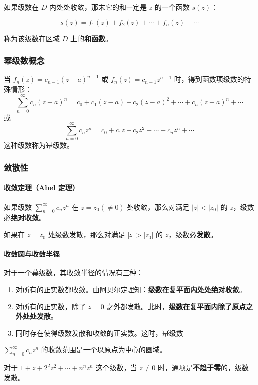 如果级数在 \(D\) 内处处收敛，那末它的和一定是 \(z\) 的一个函数
\(s(z)\)：

\[
s(z) = f_1(z) + f_2(z) + \cdots + f_n(z) + \cdots
\]

称为该级数在区域 \(D\) 上的\textbf{和函数}。
\subsubsection{幂级数概念}
\label{幂级数概念}
当 \(f_n(z) = c_{n-1}(z-a)^{n-1}\) 或 \(f_n(z) = c_{n-1}z^{n-1}\)
时，得到函数项级数的特殊情形：
\[
\sum_{n=0}^{\infty} c_n (z-a)^n = c_0 + c_1(z-a) + c_2(z-a)^2 + \cdots + c_n(z-a)^n + \cdots
\]
或
\[
\sum_{n=0}^{\infty} c_n z^n = c_0 + c_1 z + c_2 z^2 + \cdots + c_n z^n + \cdots
\]
这种级数称为幂级数。
\subsubsection{敛散性}
\label{敛散性}
\paragraph{收敛定理（Abel 定理）}
\label{收敛定理 abel 定理}
如果级数 \(\sum_{n=0}^{\infty} c_{n} z^{n}\) 在 \(z = z_{0} (\neq 0)\)
处收敛，那么对满足 \(|z| < |z_{0}|\) 的 \(z\)，级数必\textbf{绝对收敛}。

如果在 \(z = z_{0}\) 处级数发散，那么对满足 \(|z| > |z_{0}|\) 的
\(z\)，级数必\textbf{发散}。
\paragraph{收敛圆与收敛半径}
\label{收敛圆与收敛半径}
对于一个幕级数，其收敛半径的情况有三种：

\begin{enumerate}
\item 对所有的正实数都收敛。由阿贝尔定理知：\textbf{级数在复平面内处处绝对收敛}。
\item 对所有的正实数，除了 \(z=0\)
之外都发散。此时，\textbf{级数在复平面内除了原点之外处处发散}。
\item 同时存在使得级数发散和收敛的正实数。这时，幂级数
\end{enumerate}
\(\sum\limits _{n=0}^{\infty}c_nz^n\)
的收敛范围是一个以原点为中心的圆域。

\begin{tcolorbox}[title={Example},colback=red!5!white
,colframe=red!75!black
,colbacktitle=yellow!50!red
,coltitle=red!25!black, fonttitle=\bfseries,subtitle style={boxrule=0.4pt, colback=yellow!50!red!25!white}]
对于 \(1+z+2^2z^2+\cdots+n^nz^n\) 这个级数，当
\(z \ne 0\) 时，通项是\textbf{不趋于零}的，级数发散。

\end{tcolorbox}
